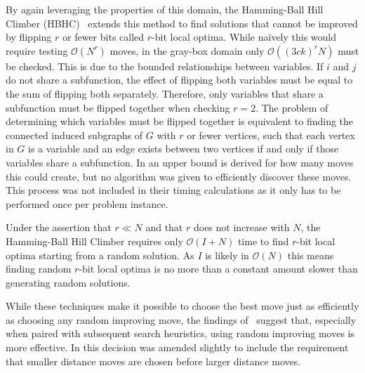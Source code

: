 \documentclass{sig-alternate}
\newcommand{\BigO}[1]{$\mathcal{O}{(#1)}$}
\begin{document}
By again leveraging the properties of this domain, the Hamming-Ball Hill Climber (HBHC)~\cite{chicano:2014:ball} extends this
method to find solutions that cannot be improved by flipping $r$
or fewer bits called $r$-bit local optima.
While na\"ively this would require testing \BigO{N^r} moves, in the gray-box domain only
\BigO{(3ck)^rN} must be checked. This is due to the bounded relationships between variables.
If $i$ and $j$ do not share a subfunction, the effect of flipping both variables
must be equal to the sum of flipping both separately. Therefore, only variables that share
a subfunction must be flipped together when checking $r=2$. The problem of determining
which variables must be flipped together is equivalent to finding the connected induced
subgraphs of $G$ with $r$ or fewer vertices, such that each vertex in $G$ is a variable
and an edge exists between two vertices if and only if those variables share a subfunction.
In \cite{chicano:2014:ball} an upper bound is derived for how many moves this could create,
but no algorithm was given to efficiently discover these moves. This process was not included
in their timing calculations as it only has to be performed once per problem instance.

Under the assertion that $r \ll N$ and that $r$ does not increase with $N$, the
Hamming-Ball Hill Climber requires only \BigO{I+N} time to find $r$-bit local optima starting
from a random solution. As $I$ is likely in \BigO{N} this means finding random $r$-bit local optima
is no more than a constant amount slower than generating random solutions.

While these techniques make it possible to choose the best move just as efficiently
as choosing any random improving move, the findings of~\cite{whitley:2013:greedy} suggest that,
especially when paired with subsequent search heuristics, using random improving moves is more effective.
In \cite{chicano:2014:ball} this decision was amended slightly to include the requirement that smaller
distance moves are chosen before larger distance moves.
\end{document}
